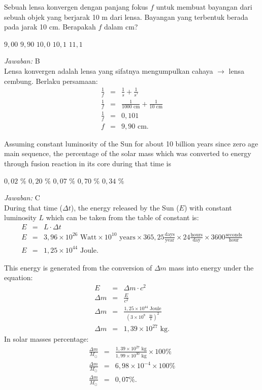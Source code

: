 \documentclass[11pt,fleqn]{exam}
\begin{document}
\begin{questions}
\question Sebuah lensa konvergen dengan panjang fokus $f$ untuk membuat bayangan dari sebuah objek yang berjarak 10 m dari lensa. Bayangan yang terbentuk berada pada jarak 10 cm. Berapakah $f$ dalam cm?
\begin{choices}
\choice $9,00$
\choice $9,90$
\choice $10,0$
\choice $10,1$
\choice $11,1$
\end{choices}

\textit{Jawaban: }B\\
Lensa konvergen adalah lensa yang sifatnya mengumpulkan cahaya $\rightarrow$ lensa cembung. Berlaku persamaan:
\begin{eqnarray*}
\frac{1}{f}&=&\frac{1}{s}+\frac{1}{s'}\\
\frac{1}{f}&=&\frac{1}{1000 \text{ cm}}+\frac{1}{10 \text{ cm}}\\
\frac{1}{f}&=&0,101\\
f&=&9,90 \text{ cm}.
\end{eqnarray*}

\question Assuming constant luminosity of the Sun for about 10 billion years since zero age main sequence, the percentage of the solar mass which was converted to energy through fusion reaction in its core during that time is
\begin{choices}
\choice $0,02$ \%
\choice $0,20$ \%
\choice $0,07$ \%
\choice $0,70$ \%
\choice $0,34$ \%
\end{choices}

\textit{Jawaban: }C\\
During that time ($\Delta t$), the energy released by the Sun ($E$) with constant luminosity $L$ which can be taken from the table of constant is:
\begin{eqnarray*}
E&=&L \cdot \Delta t\\
E&=&3,96\times 10^{26} \text{ Watt}\times 10^{10} \text{ years}\times 365,25 \frac{\text{days}}{\text{year}}\times 24 \frac{\text{hours}}{\text{day}}\times 3600 \frac{\text{seconds}}{\text{hour}}\\
E&=&1,25\times 10^{44} \text{ Joule}.
\end{eqnarray*}

This energy is generated from the conversion of $\Delta m$ mass into energy under the equation:
\begin{eqnarray*}
E&=&\Delta m \cdot c^2\\
\Delta m&=&\frac{E}{c^2}\\
\Delta m&=&\frac{1,25\times 10^{44} \text{ Joule}}{(3\times 10^8 \text{ }\frac{\text{m}}{\text{s}})^2}\\
\Delta m&=&1,39\times 10^{27} \text{ kg}.
\end{eqnarray*}
In solar masses percentage:
\begin{eqnarray*}
\frac{\Delta m}{M_{\odot}}&=&\frac{1,39\times 10^{27} \text{ kg}}{1,99\times 10^{30} \text{ kg}}\times 100\%\\
\frac{\Delta m}{M_{\odot}}&=&6,98\times 10^{-4}\times 100\%\\
\frac{\Delta m}{M_{\odot}}&=&0,07\%.
\end{eqnarray*}


\end{questions}
\end{document}
